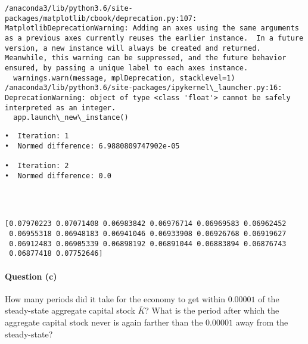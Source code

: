 \documentclass[11pt]{article}
\begin{document}
    \begin{Verbatim}[commandchars=\\\{\}]
/anaconda3/lib/python3.6/site-packages/matplotlib/cbook/deprecation.py:107: MatplotlibDeprecationWarning: Adding an axes using the same arguments as a previous axes currently reuses the earlier instance.  In a future version, a new instance will always be created and returned.  Meanwhile, this warning can be suppressed, and the future behavior ensured, by passing a unique label to each axes instance.
  warnings.warn(message, mplDeprecation, stacklevel=1)
/anaconda3/lib/python3.6/site-packages/ipykernel\_launcher.py:16: DeprecationWarning: object of type <class 'float'> cannot be safely interpreted as an integer.
  app.launch\_new\_instance()

    \end{Verbatim}

    \begin{Verbatim}[commandchars=\\\{\}]
•  Iteration: 1 
•  Normed difference: 6.9880809747902e-05 

•  Iteration: 2 
•  Normed difference: 0.0 


    \end{Verbatim}

    \begin{center}
    \end{center}
    { \hspace*{\fill} \\}
    
    \begin{Verbatim}[commandchars=\\\{\}]
[0.07970223 0.07071408 0.06983842 0.06976714 0.06969583 0.06962452
 0.06955318 0.06948183 0.06941046 0.06933908 0.06926768 0.06919627
 0.06912483 0.06905339 0.06898192 0.06891044 0.06883894 0.06876743
 0.06877418 0.07752646]

    \end{Verbatim}

    \paragraph{Question (c)}\label{question-c}

How many periods did it take for the economy to get within \(0.00001\)
of the steady-state aggregate capital stock \(\bar K\)? What is the
period after which the aggregate capital stock never is again farther
than the \(0.00001\) away from the steady-state?
\end{document}
